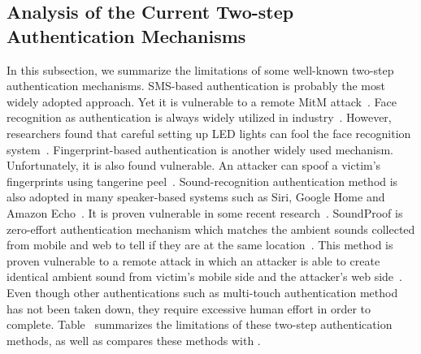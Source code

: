 \subsection{Analysis of the Current Two-step Authentication Mechanisms}
In this subsection, we summarize the limitations of some well-known two-step authentication mechanisms. SMS-based  authentication is probably the most widely adopted approach. Yet it is vulnerable to a remote MitM attack~\cite{gelernter2017password}. Face recognition as authentication is always widely utilized in industry~\cite{faceauth}. However, researchers found that careful setting up LED lights can fool the face recognition system~\cite{zhou2018invisible}. Fingerprint-based authentication is another widely used mechanism. Unfortunately, it is also found vulnerable. An attacker can spoof a victim's fingerprints using tangerine peel~\cite{tangerinpeel}. Sound-recognition authentication method is also adopted in many speaker-based systems such as Siri, Google Home and Amazon Echo~\cite{marley1988system}. It is proven vulnerable in some recent research~\cite{zhang2017dolphinattack}. SoundProof is zero-effort authentication mechanism which matches the ambient sounds collected from mobile and web to tell if they are at the same location~\cite{karapanos2015soundproof}. This method is proven vulnerable to a remote attack in which an attacker is able to create identical ambient sound from victim's mobile side and the attacker's web side~\cite{shrestha2016sounds}. Even though other authentications such as multi-touch authentication method has not been taken down, they require excessive human effort in order to complete. Table~\cite{tbl:limit} summarizes the limitations of these two-step authentication methods, as well as compares these methods with \name.

